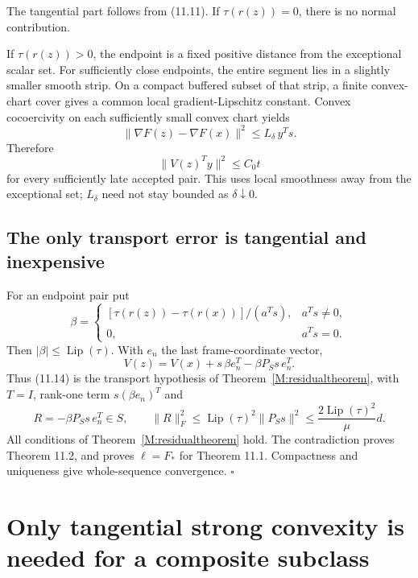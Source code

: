 The tangential part follows from (11.11). If \(\tau(r(z))=0\), there is no
normal contribution.

If \(\tau(r(z))>0\), the endpoint is a fixed positive distance from the
exceptional scalar set. For sufficiently close endpoints, the entire
segment lies in a slightly smaller smooth strip. On a compact buffered
subset of that strip, a finite convex-chart cover gives a common local
gradient-Lipschitz constant. Convex cocoercivity on each sufficiently
small convex chart yields \[
 \|\nabla F(z)-\nabla F(x)\|^2\le L_\delta\,y^Ts.
\] Therefore \[
 \|V(z)^Ty\|^2\le C_0t\tag{11.13}
\] for every sufficiently late accepted pair. This uses local smoothness
away from the exceptional set; \(L_\delta\) need not stay bounded as
\(\delta\downarrow0\).



\subsection{The only transport error is tangential and
inexpensive}\label{U:the-only-transport-error-is-tangential-and-inexpensive}

For an endpoint pair put \[
 \beta=\begin{cases}
 [\tau(r(z))-\tau(r(x))]/(a^Ts),&a^Ts\ne0,\\
 0,&a^Ts=0.
 \end{cases}
\] Then \(|\beta|\le\operatorname{Lip}(\tau)\). With \(e_n\) the last
frame-coordinate vector, \[
 \boxed{
 V(z)=V(x)+s\,\beta e_n^T-\beta P_Ss\,e_n^T.
 }\tag{11.14}
\] Thus (11.14) is the transport hypothesis of Theorem~\ref{M:residualtheorem}, with \(T=I\), rank-one term \(s(\beta e_n)^T\) and \[
 R=-\beta P_Ss\,e_n^T\in S,
 \qquad
 \|R\|_F^2\le\operatorname{Lip}(\tau)^2\|P_Ss\|^2
 \le\frac{2\operatorname{Lip}(\tau)^2}{\mu}d.\tag{11.15}
\] All conditions of Theorem~\ref{M:residualtheorem} hold. The contradiction proves Theorem 11.2,
and proves \(\ell=F_*\) for Theorem 11.1. Compactness and uniqueness give
whole-sequence convergence. \(\square\)


\setcounter{section}{5}
\setcounter{theorem}{0}
\setcounter{lemma}{0}
\setcounter{corollary}{0}
\setcounter{proposition}{0}
\setcounter{remark}{0}
\setcounter{equation}{0}


\section{Only tangential strong convexity is needed for a composite
subclass}\label{U:only-tangential-strong-convexity-is-needed-for-a-composite-subclass}

